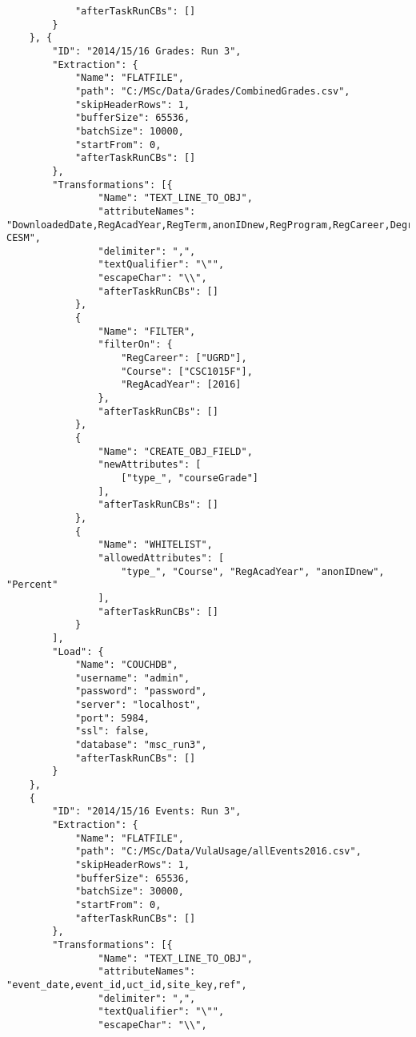 \begin{verbatim}
            "afterTaskRunCBs": []
        }
    }, {
        "ID": "2014/15/16 Grades: Run 3",
        "Extraction": {
            "Name": "FLATFILE",
            "path": "C:/MSc/Data/Grades/CombinedGrades.csv",
            "skipHeaderRows": 1,
            "bufferSize": 65536,
            "batchSize": 10000,
            "startFrom": 0,
            "afterTaskRunCBs": []
        },
        "Transformations": [{
                "Name": "TEXT_LINE_TO_OBJ",
                "attributeNames": "DownloadedDate,RegAcadYear,RegTerm,anonIDnew,RegProgram,RegCareer,Degree,DegreeDescr,Subject,Catalog.,Course,CourseSuffix,Session,Percent,Symbol,UnitsTaken,CourseID,CourseDescr,CourseCareer,Faculty,Dept,MaximumCrseUnits,CourseCount,CourseLevel,CESM,Sub-CESM",
                "delimiter": ",",
                "textQualifier": "\"",
                "escapeChar": "\\",
                "afterTaskRunCBs": []
            },
            {
                "Name": "FILTER",
                "filterOn": {
                    "RegCareer": ["UGRD"],
                    "Course": ["CSC1015F"],
                    "RegAcadYear": [2016]
                },
                "afterTaskRunCBs": []
            },
            {
                "Name": "CREATE_OBJ_FIELD",
                "newAttributes": [
                    ["type_", "courseGrade"]
                ],
                "afterTaskRunCBs": []
            },
            {
                "Name": "WHITELIST",
                "allowedAttributes": [
                    "type_", "Course", "RegAcadYear", "anonIDnew", "Percent"
                ],
                "afterTaskRunCBs": []
            }
        ],
        "Load": {
            "Name": "COUCHDB",
            "username": "admin",
            "password": "password",
            "server": "localhost",
            "port": 5984,
            "ssl": false,
            "database": "msc_run3",
            "afterTaskRunCBs": []
        }
    },
    {
        "ID": "2014/15/16 Events: Run 3",
        "Extraction": {
            "Name": "FLATFILE",
            "path": "C:/MSc/Data/VulaUsage/allEvents2016.csv",
            "skipHeaderRows": 1,
            "bufferSize": 65536,
            "batchSize": 30000,
            "startFrom": 0,
            "afterTaskRunCBs": []
        },
        "Transformations": [{
                "Name": "TEXT_LINE_TO_OBJ",
                "attributeNames": "event_date,event_id,uct_id,site_key,ref",
                "delimiter": ",",
                "textQualifier": "\"",
                "escapeChar": "\\",

\end{verbatim}
